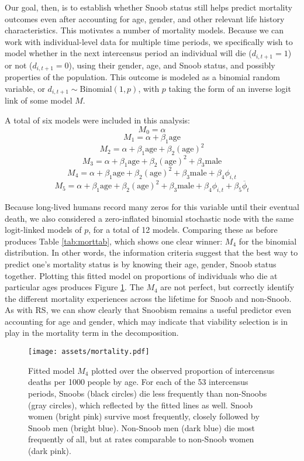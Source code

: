 \documentclass[11pt]{article}
\begin{document}
Our goal, then, is to establish whether Snoob status still helps predict mortality outcomes even after accounting for age, gender, and other relevant life history characteristics.  This motivates a number of mortality models.  Because we can work with individual-level data for multiple time periods, we specifically wish to model whether in the next intercensus period an individual will die ($d_{i,t+1} = 1$) or not ($d_{i,t+1}=0$), using their gender, age, and Snoob status, and possibly properties of the population.  This outcome is modeled as a binomial random variable, or $d_{i,t+1} \sim \mathrm{Binomial}(1,p)$, with $p$ taking the form of an inverse logit link of some model $M$.

A total of six models were included in this analysis:
	\[M_0 = \alpha
\]
	\[M_1 = \alpha + \beta_1 \mathrm{age}
\]
	\[M_2 = \alpha + \beta_1 \mathrm{age} + \beta_2 \mathrm{(age)}^2
\]
	\[M_3 = \alpha + \beta_1 \mathrm{age} + \beta_2 \mathrm{(age)}^2 + \beta_3 \mathrm{male}
\]
	\[M_4 = \alpha + \beta_1 \mathrm{age} + \beta_2 \mathrm{(age)}^2 + \beta_3 \mathrm{male} + \beta_4 \phi_{i,t}
\]
	\[M_5 = \alpha + \beta_1 \mathrm{age} + \beta_2 \mathrm{(age)}^2 + \beta_3 \mathrm{male} + \beta_4 \phi_{i,t} + \beta_5 \overline{\phi}_t
\]

Because long-lived humans record many zeros for this variable until their eventual death, we also considered a zero-inflated binomial stochastic node with the same logit-linked models of $p$, for a total of 12 models.  Comparing these as before produces Table \ref{tab:morttab}, which shows one clear winner: $M_4$ for the binomial distribution.  In other words, the information criteria suggest that the best way to predict one's mortality status is by knowing their age, gender, Snoob status together.  Plotting this fitted model on proportions of individuals who die at particular ages produces Figure \ref{fig:mortality}.  The $M_4$ are not perfect, but correctly identify the different mortality experiences across the lifetime for Snoob and non-Snoob.  As with RS, we can show clearly that Snoobism remains a useful predictor even accounting for age and gender, which may indicate that viability selection is in play in the mortality term in the decomposition.  



\begin{figure}[t]
\begin{center}
\texttt{[image: assets/mortality.pdf]}
\caption{Fitted model $M_{4}$ plotted over the observed proportion of intercensus deaths per 1000 people by age.  For each of the 53 intercensus periods, Snoobs (black circles) die less frequently than non-Snoobs (gray circles), which reflected by the fitted lines as well.  Snoob women (bright pink) survive most frequently, closely followed by Snoob men (bright blue).  Non-Snoob men (dark blue) die most frequently of all, but at rates comparable to non-Snoob women (dark pink).}
\label{fig:mortality}
\end{center}
\end{figure}
\end{document}
